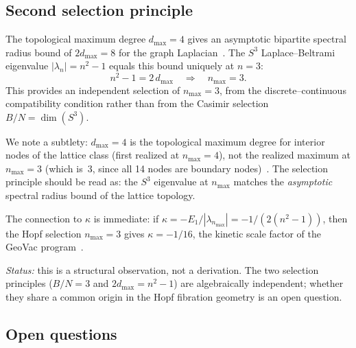 \documentclass[aps,prl,twocolumn,superscriptaddress]{revtex4-2}
\begin{document}
\subsection{Second selection principle}\label{sec:second_selection}

The topological maximum degree $d_{\max} = 4$ gives an asymptotic
bipartite spectral radius bound of $2 d_{\max} = 8$ for the graph
Laplacian~\cite{phase1_kappa}. The $S^3$ Laplace--Beltrami eigenvalue
$|\lambda_n| = n^2 - 1$ equals this bound uniquely at $n = 3$:
\begin{equation}\label{eq:second_selection}
  n^2 - 1 = 2\,d_{\max} \quad\Longrightarrow\quad n_{\max} = 3.
\end{equation}
This provides an independent selection of $n_{\max} = 3$, from the
discrete--continuous compatibility condition rather than from the Casimir
selection $B/N = \dim(S^3)$.

We note a subtlety: $d_{\max} = 4$ is the topological maximum degree for
interior nodes of the lattice class (first realized at $n_{\max} = 4$),
not the realized maximum at $n_{\max} = 3$ (which is~$3$, since all 14
nodes are boundary nodes)~\cite{phase2_kappa}. The selection principle
should be read as: the $S^3$ eigenvalue at $n_{\max}$ matches the
\textit{asymptotic} spectral radius bound of the lattice topology.

The connection to $\kappa$ is immediate: if
$\kappa = -E_1/|\lambda_{n_{\max}}| = -1/(2(n^2-1))$, then the Hopf
selection $n_{\max} = 3$ gives $\kappa = -1/16$, the kinetic scale
factor of the GeoVac program~\cite{paper7}.

\textit{Status:} this is a structural observation, not a derivation. The
two selection principles ($B/N = 3$ and $2d_{\max} = n^2 - 1$) are
algebraically independent; whether they share a common origin in the
Hopf fibration geometry is an open question.


\subsection{Open questions}
\end{document}
